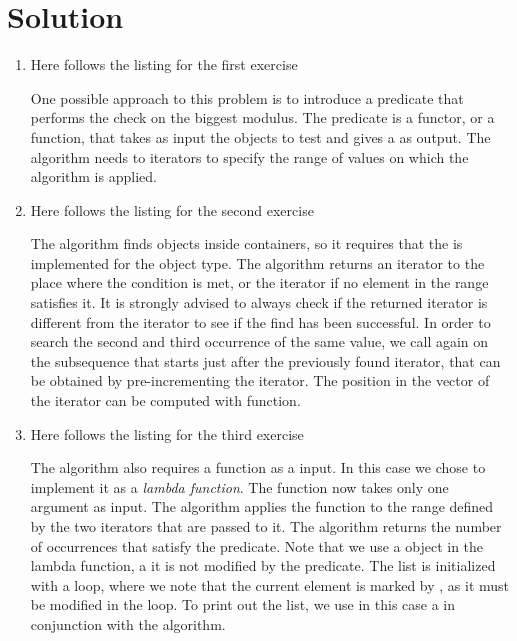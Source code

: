\newpage

\section*{Solution}

\begin{enumerate}
    \item Here follows the listing for the first exercise
    \lstset{basicstyle=\scriptsize\sf}
    
    \lstset{basicstyle=\sf}
    One possible approach to this problem is to introduce a predicate that
    performs the check on the biggest modulus. The predicate is a functor, or a
    function, that takes as input the objects to test and gives a  as
    output. The  algorithm needs to iterators to specify the range of
    values on which the algorithm is applied.
	
    \item Here follows the listing for the second exercise
    \lstset{basicstyle=\scriptsize\sf}
    
    \lstset{basicstyle=\sf}
    The  algorithm finds objects inside containers, so it requires
    that the  is implemented for the object type. The algorithm
    returns an iterator to the place where the condition is met, or the
     iterator if no element in the range satisfies it. It is strongly
    advised to always check if the returned iterator is different from the
     iterator to see if the find has been successful. In order to
    search the second and third occurrence of the same value, we call again
     on the subsequence that starts just after the previously found
    iterator, that can be obtained by pre-incrementing the iterator. The
    position in the vector of the iterator can be computed with 
    function.
		
    \item Here follows the listing for the third exercise
    \lstset{basicstyle=\scriptsize\sf}
    
    \lstset{basicstyle=\sf}
    The  algorithm also requires a function as a input. In this
    case we chose to implement it as a \emph{lambda function}. The function now
    takes only one argument as input. The algorithm applies the function to the
    range defined by the two iterators that are passed to it. The algorithm
    returns the number of occurrences that satisfy the predicate. Note that we
    use a  object in the lambda function, a it is not modified by the
    predicate. The list is initialized with a  loop, where we
    note that the current element is marked by , as it must be
    modified in the loop. To print out the list, we use in this case a
     in conjunction with the  algorithm.
		

\end{enumerate}
